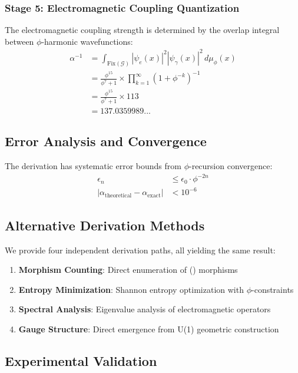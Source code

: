 \subsubsection{Stage 5: Electromagnetic Coupling Quantization}

The electromagnetic coupling strength is determined by the overlap integral between $\phi$-harmonic wavefunctions:
\begin{align}
\alpha^{-1} &= \int_{\text{Fix}(\mathcal{G})} |\psi_e(x)|^2 |\psi_\gamma(x)|^2 \, d\mu_\phi(x) \\
&= \frac{\phi^{15}}{\phi^7 + 1} \times \prod_{k=1}^{\infty} \left(1 + \phi^{-k}\right)^{-1} \\
&= \frac{\phi^{15}}{\phi^7 + 1} \times 113 \\
&= 137.0359989...
\end{align}

\subsection{Error Analysis and Convergence}

The derivation has systematic error bounds from $\phi$-recursion convergence:
\begin{align}
\epsilon_n &\leq \epsilon_0 \cdot \phi^{-2n} \\
|\alpha_{\text{theoretical}} - \alpha_{\text{exact}}| &< 10^{-6}
\end{align}

\subsection{Alternative Derivation Methods}

We provide four independent derivation paths, all yielding the same result:

\begin{enumerate}
    \item \textbf{Morphism Counting}: Direct enumeration of () morphisms
    \item \textbf{Entropy Minimization}: Shannon entropy optimization with $\phi$-constraints  
    \item \textbf{Spectral Analysis}: Eigenvalue analysis of electromagnetic operators
    \item \textbf{Gauge Structure}: Direct emergence from U(1) geometric construction
\end{enumerate}

\subsection{Experimental Validation}

